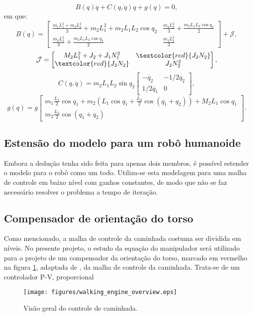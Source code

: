 \begin{equation}
\label{eq:dinamica}
B(q) \ddot{q} + C(q, \dot{q}) \dot{q} + g(q) = 0,
\end{equation}
em que:
\begin{equation}
B(q) = \begin{bmatrix} \frac{m_1 L_1^2 + m_2 L_2^2}{3} + m_2 L_1^2 + m_2 L_1 L_2 \cos q_2 & \frac{m_2 L_2^2}{3}+\frac{m_2 L_1 L_2 \cos q_2}{2}\\ \frac{m_2 L_2^2}{3}+\frac{m_2 L_1 L_2 \cos q_2}{2} &\frac{m_2 L_2^2}{3} \end{bmatrix} + \mathcal{J},
\end{equation}
\begin{equation}
\label{eq:J}
\mathcal{J} = \begin{bmatrix} M_2 L_1^2 + J_2 + J_1 N_1^2 & \textcolor{red}{J_2 N_2} \\ \textcolor{red}{J_2 N_2} & J_2 N_2^2 \end{bmatrix},
\end{equation}
\begin{equation}
C(q,\dot{q})=m_2 L_1 L_2 \sin q_2 \begin{bmatrix} -\dot{q_2} & -1/2 \dot{q_2} \\ 1/2 \dot{q_1} & 0 \end{bmatrix},
\end{equation}
\begin{equation}
g(q) = g \begin{bmatrix} m_1 \frac{L_1}{2}\cos q_1 + m_2 \left(L_1 \cos q_1 + \frac{L_2}{2} \cos (q_1+q_2) \right) + M_2 L_1 \cos q_1 \\ m_2 \frac{L_2}{2} \cos (q_1+q_2) \end{bmatrix}.
\end{equation}
\subsection{Estensão do modelo para um robô humanoide}
Embora a dedução tenha sido feita para apenas dois membros, é possível estender o modelo para o robô como um todo. Utiliza-se esta modelagem para uma malha de controle em baixo nível com ganhos constantes, de modo que não se faz necessário resolver o problema a tempo de iteração.
\subsection{Compensador de orientação do torso}

Como mencionado, a malha de controle da caminhada costuma ser dividida em níveis. No presente projeto, o estudo da equação do manipulador será utilizado para o projeto de um compensador da orientação do torso, marcado em vermelho na figura \ref{FIG: doc manga}, adaptada de \cite{tesemarcos}, da malha de controle da caminhada. Trata-se de um controlador P-V, proporcional
\begin{figure} 
	\centering
	\texttt{[image: figures/walking\_engine\_overview.eps]}
	\caption{Visão geral do controle de caminhada.}
	\label{FIG: doc manga}
\end{figure} 


